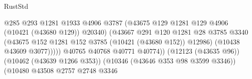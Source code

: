 \begin{lexlean}{RustStd}
\begin{coremodule}
                                                          @285
                                                          @293
                                                          @1281
                                                          @1933
                                                          @4906
                                                          @3787
                                                          (@43675
                                                            @129
                                                            @1281
                                                            @129
                                                            @4906
                                                            (@10421 (@43680 @129))
                                                            @20340)
                                                          (@43667
                                                            @291
                                                            @120
                                                            @1281
                                                            @28
                                                            @3785
                                                            @3340
                                                            (@43675
                                                              @152
                                                              @1281
                                                              @152
                                                              @3785
                                                              (@10421 (@43680 @152))
                                                              @12986)
                                                            (@10438 @43609 @3077)))))
                                                    @40765
                                                    @40768
                                                    @40771
                                                    @40774))
                                                (@12123 (@43635 @96))
                                                (@10462 (@43639 @1266 @353))
                                                (@10346 (@43646 @353 @98 @3599 @3346))
                                                (@10480
                                                  @43508
                                                  @2757
                                                  @2748
                                                  @3346

\end{coremodule}
\end{lexlean}
